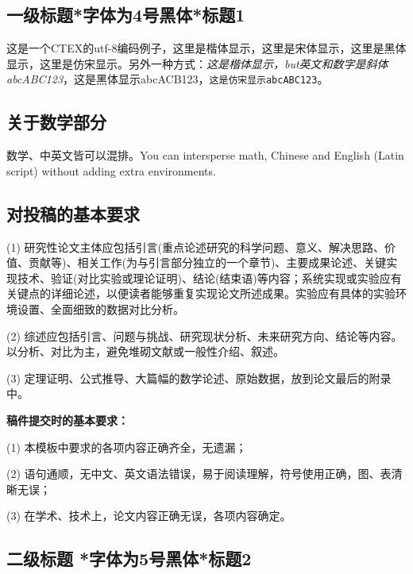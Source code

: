 \documentclass[10.5pt,compsoc,UTF8]{CjC}
\theoremstyle{mystyle}
\begin{document}
\vspace {5mm}


\vskip 1mm
\begin{multicols}{1}

\section{\heiti 一级标题*字体为4号黑体*标题1}

这是一个CTEX的utf-8编码例子，{\kaishu 这里是楷体显示}，{\songti 这里是宋体显示}，{\heiti 这里是黑体显示}，{\fangsong 这里是仿宋显示}。另外一种方式：\textit{这是楷体显示，but英文和数字是斜体abcABC123}，\textsf{这是黑体显示abcACB123}，\texttt{这是仿宋显示abcABC123}。

\subsection{\heiti 关于数学部分}
数学、中英文皆可以混排。You can intersperse math, Chinese and English (Latin script) without adding extra environments.

\subsection{\heiti 对投稿的基本要求}

(1) 研究性论文主体应包括引言(重点论述研究的科学问题、意义、解决思路、价值、贡献等)、相关工作(为与引言部分独立的一个章节)、主要成果论述、关键实现技术、验证(对比实验或理论证明)、结论(结束语)等内容；系统实现或实验应有关键点的详细论述，以便读者能够重复实现论文所述成果。实验应有具体的实验环境设置、全面细致的数据对比分析。

(2) 综述应包括引言、问题与挑战、研究现状分析、未来研究方向、结论等内容。以分析、对比为主，避免堆砌文献或一般性介绍、叙述。

(3) 定理证明、公式推导、大篇幅的数学论述、原始数据，放到论文最后的附录中。

{\bf 稿件提交时的基本要求：}

(1) 本模板中要求的各项内容正确齐全，无遗漏；

(2) 语句通顺，无中文、英文语法错误，易于阅读理解，符号使用正确，图、表清晰无误；

(3) 在学术、技术上，论文内容正确无误，各项内容确定。

{\heiti \subsection{二级标题 *字体为5号黑体*标题2}}

\end{multicols}
\end{document}
